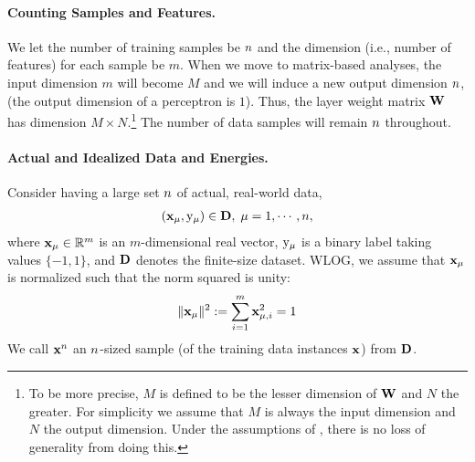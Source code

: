 \paragraph{Counting Samples and Features.}
We let the number of training samples be $n$ and the dimension 
(i.e., number of features) for each sample be $m$.
When we move to matrix-based analyses, 
the input dimension $m$ will become $M$ and we will induce a new output dimension $n$, (the output dimension of a perceptron is $1$). Thus, the layer weight matrix ${\mathbf{W}}$ has dimension $M\times N$.\footnote{To be more precise, $M$ is defined to be the lesser dimension of ${\mathbf{W}}$ and $N$ the greater. For simplicity we assume that $M$ is always the input dimension and $N$ the output dimension. Under the assumptions of \SETOL, there is no loss of generality from doing this.} The number of data samples will remain $n$ throughout.



\paragraph{Actual and Idealized Data and Energies.}

Consider having a large set $n$ of actual, real-world data, 
\begin{align}
  \label{eqn:x}
  \left( {\mathbf{x}}_{\mu}, \mathrm{y}_{\mu} \right) \in\mathbf{D},\;\mu=1, \cdots, n,
\end{align}
where 
${\mathbf{x}}_{\mu}\in\mathbb{R}^{m}$ is an $m$-dimensional real vector, 
$\mathrm{y}_{\mu}$ is a binary label taking values $\{-1,1\}$, and 
$\mathbf{D}$ denotes the finite-size dataset.
WLOG, we assume that ${\mathbf{x}}_{\mu}$ is normalized such that the norm squared is unity:
\begin{equation}
  \label{eqn:XVEC_norm}
  \Vert{\mathbf{x}}_{\mu}\Vert^{2} := \sum_{i=1}^{m} {\mathbf{x}}_{\mu,i}^{2}=1
\end{equation}
We call ${\mathbf{x}}^{n}$ an $n$-sized sample (of the training data instances ${\mathbf{x}}$) from $\mathbf{D}$. 

